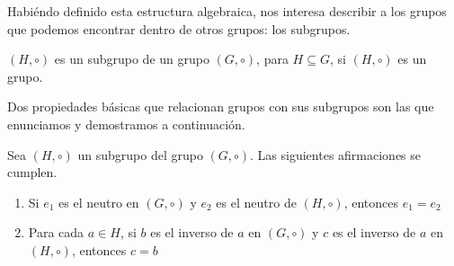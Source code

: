 Habiéndo definido esta estructura algebraica, nos interesa describir a los grupos que podemos encontrar dentro de otros grupos: los subgrupos.
\begin{definition}
$(H, \circ)$ es un subgrupo de un grupo $(G, \circ)$, para $H \subseteq G$, si $(H, \circ)$ es un grupo.
\end{definition}

Dos propiedades básicas que relacionan grupos con sus subgrupos son las que enunciamos y demostramos a continuación.

\begin{proposition}
Sea $(H, \circ)$ un subgrupo del grupo $(G, \circ)$. Las siguientes afirmaciones se cumplen.
	\begin{enumerate}
		\item Si $e_1$ es el neutro en $(G, \circ)$ y $e_2$ es el neutro de $(H, \circ)$, entonces $e_1 = e_2$

		\item Para cada $a \in H$, si $b$ es el inverso de $a$ en $(G, \circ)$ y $c$ es el inverso de $a$ en $(H, \circ)$, entonces $c = b$
	\end{enumerate}
\end{proposition}




